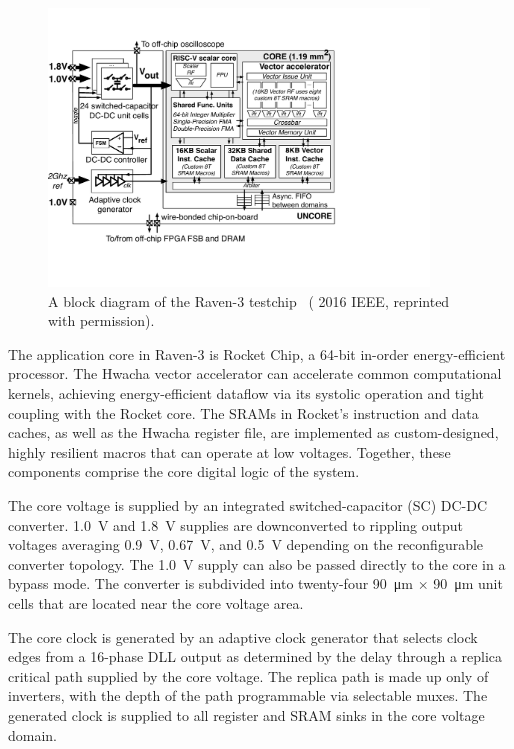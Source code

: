 \documentclass[graybox]{svmult}
\begin{document}
\begin{figure}
  \centering
  \includegraphics[width=0.9\textwidth]{6-raven3-blockdiagram}
  \caption{A block diagram of the Raven-3 testchip~\cite{Zimmer2016} ({\textcopyright} 2016 IEEE, reprinted with permission).}
  \label{fig:6-raven3-blockdiagram}
\end{figure}

The application core in Raven-3 is Rocket Chip, a 64-bit in-order energy-efficient processor.
The Hwacha vector accelerator can accelerate common computational kernels, achieving energy-efficient dataflow via its systolic operation and tight coupling with the Rocket core.
The SRAMs in Rocket's instruction and data caches, as well as the Hwacha register file, are implemented as custom-designed, highly resilient macros that can operate at low voltages.
Together, these components comprise the core digital logic of the system.

The core voltage is supplied by an integrated switched-capacitor (SC) DC-DC converter.
\SI{1.0}{\volt} and \SI{1.8}{\volt} supplies are downconverted to rippling output voltages averaging \SI{0.9}{\volt}, \SI{0.67}{\volt}, and \SI{0.5}{\volt} depending on the reconfigurable converter topology.
The \SI{1.0}{\volt} supply can also be passed directly to the core in a bypass mode.
The converter is subdivided into twenty-four \SI{90}{\micro\meter} $\times$ \SI{90}{\micro\meter} unit cells that are located near the core voltage area.

The core clock is generated by an adaptive clock generator that selects clock edges from a 16-phase DLL output as determined by the delay through a replica critical path supplied by the core voltage.
The replica path is made up only of inverters, with the depth of the path programmable via selectable muxes.
The generated clock is supplied to all register and SRAM sinks in the core voltage domain.
\end{document}
